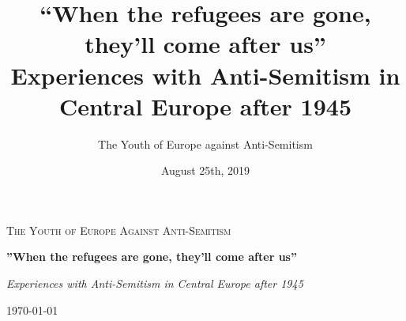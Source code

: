 \documentclass{book}
\title{``When the refugees are gone, they'll come after us''\\ Experiences with Anti-Semitism in Central Europe after 1945}
\author{The Youth of Europe against Anti-Semitism}
\date{August 25th, 2019}
\begin{document}
	\setlength{\parindent}{0pt}
	\setlength{\parskip}{1em}
\begin{titlepage}
	\centering
	{\scshape\LARGE The Youth of Europe
	Against Anti-Semitism \par}
	\vspace{1cm}
	{\huge\bfseries''When the refugees are gone, they'll come after us'' \par}
	\vspace{2cm}
	{\Large\itshape Experiences with Anti-Semitism in Central Europe after 1945\par}
	\vfill
	{\large\today\par}
\end{titlepage}
\thispagestyle{empty}
\tableofcontents



%




%

%
%

%

%


 




%

%

\nocite{*}
\printbibliography
\end{document}
